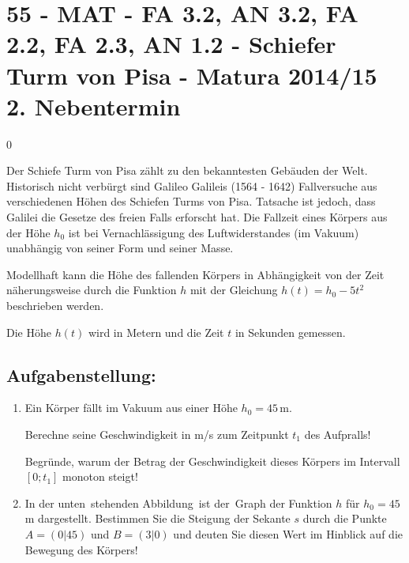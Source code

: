 \section{55 - MAT - FA 3.2, AN 3.2, FA 2.2, FA 2.3, AN 1.2 - Schiefer Turm von Pisa - Matura 2014/15 2. Nebentermin}

\begin{langesbeispiel} \item[0] %
				
	Der Schiefe Turm von Pisa zählt zu den bekanntesten Gebäuden der Welt. Historisch nicht verbürgt sind Galileo Galileis (1564 - 1642) Fallversuche aus verschiedenen Höhen des Schiefen Turms von Pisa. Tatsache ist jedoch, dass Galilei die Gesetze des freien Falls erforscht hat. Die Fallzeit eines Körpers aus der Höhe $h_0$ ist bei Vernachlässigung des Luftwiderstandes (im Vakuum) unabhängig von seiner Form und seiner Masse. 
	
	Modellhaft kann die Höhe des fallenden Körpers in Abhängigkeit von der Zeit näherungsweise durch die Funktion $h$ mit der Gleichung $h(t)=h_0-5t^2$ beschrieben werden. 
	
	Die Höhe $h(t)$ wird in Metern und die Zeit $t$ in Sekunden gemessen.


\subsection{Aufgabenstellung:}
\begin{enumerate}
	\item Ein Körper fällt im Vakuum aus einer Höhe $h_0=45$\,m.
	
	 Berechne seine Geschwindigkeit in m/s zum Zeitpunkt $t_1$ des Aufpralls!\leer
	
	Begründe, warum der Betrag der Geschwindigkeit dieses Körpers im Intervall $[0;t_1]$ monoton steigt!
	
\item In der unten stehenden Abbildung ist der Graph der Funktion $h$ für $h_0=45$\,m dargestellt.  Bestimmen Sie die Steigung der Sekante $s$ durch die Punkte $A=(0|45)$ und $B=(3|0)$ und  deuten Sie diesen Wert im Hinblick auf die Bewegung des Körpers!


\end{enumerate}
\end{langesbeispiel}
